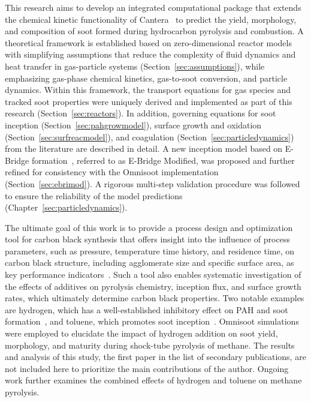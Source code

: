 This research aims to develop an integrated computational package that extends the chemical kinetic functionality of Cantera~\citep{cantera} to predict the yield, morphology, and composition of soot formed during hydrocarbon pyrolysis and combustion. A theoretical framework is established based on zero-dimensional reactor models with simplifying assumptions that reduce the complexity of fluid dynamics and heat transfer in gas-particle systems (Section~\ref{sec:assumptions}), while emphasizing gas-phase chemical kinetics, gas-to-soot conversion, and particle dynamics. Within this framework, the transport equations for gas species and tracked soot properties were uniquely derived and implemented as part of this research (Section~\ref{sec:reactors}). In addition, governing equations for soot inception (Section~\ref{sec:pahgrowmodel}), surface growth and oxidation (Section~\ref{sec:surfreacmodel}), and coagulation (Section~\ref{sec:particledynamics}) from the literature are described in detail. A new inception model based on E-Bridge formation~\citep{frenklach2020mechanism}, referred to as E-Bridge Modified, was proposed and further refined for consistency with the Omnisoot implementation (Section~\ref{sec:ebrimod}). A rigorous multi-step validation procedure was followed to ensure the reliability of the model predictions (Chapter~\ref{sec:particledynamics}).

The ultimate goal of this work is to provide a process design and optimization tool for carbon black synthesis that offers insight into the influence of process parameters, such as pressure, temperature time history, and residence time, on carbon black structure, including agglomerate size and specific surface area, as key performance indicators~\citep{murphy2001additives}. Such a tool also enables systematic investigation of the effects of additives on pyrolysis chemistry, inception flux, and surface growth rates, which ultimately determine carbon black properties. Two notable examples are hydrogen, which has a well-established inhibitory effect on PAH and soot formation~\citep{eremin2012experimental}, and toluene, which promotes soot inception~\citep{harris1984soot}. Omnisoot simulations were employed to elucidate the impact of hydrogen addition on soot yield, morphology, and maturity during shock-tube pyrolysis of methane. The results and analysis of this study, the first paper in the list of secondary publications, are not included here to prioritize the main contributions of the author. Ongoing work further examines the combined effects of hydrogen and toluene on methane pyrolysis.

